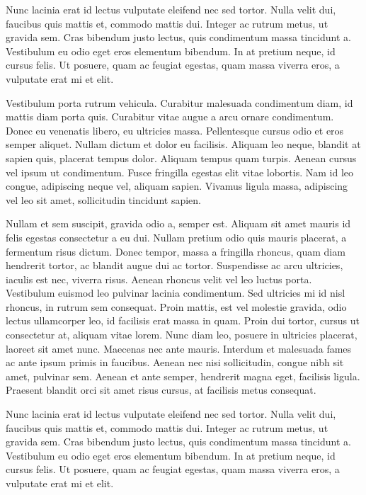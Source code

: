 \documentclass[11pt,a4paper,english]{report}
\begin{document}
\par Nunc lacinia erat id lectus vulputate eleifend nec sed tortor. Nulla velit dui, faucibus quis mattis et, commodo mattis dui. Integer ac rutrum metus, ut gravida sem. Cras bibendum justo lectus, quis condimentum massa tincidunt a. Vestibulum eu odio eget eros elementum bibendum. In at pretium neque, id cursus felis. Ut posuere, quam ac feugiat egestas, quam massa viverra eros, a vulputate erat mi et elit. 


\par Vestibulum porta rutrum vehicula. Curabitur malesuada condimentum diam, id mattis diam porta quis. Curabitur vitae augue a arcu ornare condimentum. Donec eu venenatis libero, eu ultricies massa. Pellentesque cursus odio et eros semper aliquet. Nullam dictum et dolor eu facilisis. Aliquam leo neque, blandit at sapien quis, placerat tempus dolor. Aliquam tempus quam turpis. Aenean cursus vel ipsum ut condimentum. Fusce fringilla egestas elit vitae lobortis. Nam id leo congue, adipiscing neque vel, aliquam sapien. Vivamus ligula massa, adipiscing vel leo sit amet, sollicitudin tincidunt sapien.

\par Nullam et sem suscipit, gravida odio a, semper est. Aliquam sit amet mauris id felis egestas consectetur a eu dui. Nullam pretium odio quis mauris placerat, a fermentum risus dictum. Donec tempor, massa a fringilla rhoncus, quam diam hendrerit tortor, ac blandit augue dui ac tortor. Suspendisse ac arcu ultricies, iaculis est nec, viverra risus. Aenean rhoncus velit vel leo luctus porta. Vestibulum euismod leo pulvinar lacinia condimentum. Sed ultricies mi id nisl rhoncus, in rutrum sem consequat. Proin mattis, est vel molestie gravida, odio lectus ullamcorper leo, id facilisis erat massa in quam. Proin dui tortor, cursus ut consectetur at, aliquam vitae lorem. Nunc diam leo, posuere in ultricies placerat, laoreet sit amet nunc. Maecenas nec ante mauris. Interdum et malesuada fames ac ante ipsum primis in faucibus. Aenean nec nisi sollicitudin, congue nibh sit amet, pulvinar sem. Aenean et ante semper, hendrerit magna eget, facilisis ligula. Praesent blandit orci sit amet risus cursus, at facilisis metus consequat.

\par Nunc lacinia erat id lectus vulputate eleifend nec sed tortor. Nulla velit dui, faucibus quis mattis et, commodo mattis dui. Integer ac rutrum metus, ut gravida sem. Cras bibendum justo lectus, quis condimentum massa tincidunt a. Vestibulum eu odio eget eros elementum bibendum. In at pretium neque, id cursus felis. Ut posuere, quam ac feugiat egestas, quam massa viverra eros, a vulputate erat mi et elit. 
\end{document}
